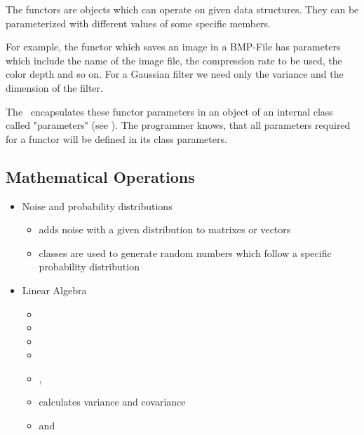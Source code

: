 The functors are objects which can operate on given data structures. They can
be parameterized with different values of some specific members.

For example, the functor which saves an image in a BMP-File has parameters
which include the name of the image file, the compression rate to be used, the
color depth and so on. For a Gaussian filter we need only the variance and the
dimension of the filter.

The \ltilib\ encapsulates these functor parameters in an object of an internal class called "parameters" (see ). The programmer knows, that all parameters required for a functor will be defined in its class parameters.

\subsection{Mathematical Operations}\label{mathOp}
\begin{itemize}
\item
Noise and probability distributions\begin{itemize}
\item
{} adds noise with a given distribution to matrixes or vectors \item
{} classes are used to generate random numbers which follow a specific
probability distribution\end{itemize}
\item
Linear Algebra\begin{itemize}
\item
{}\item
{}\item
{}\item
{}\item
{}, \item
{} calculates variance and covariance\item
{} and \end{itemize}
\end{itemize}

